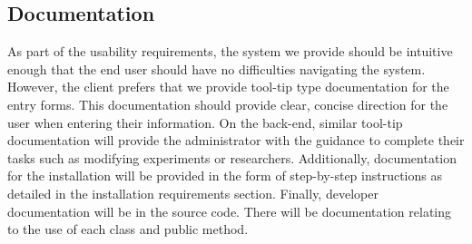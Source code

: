 \subsection{Documentation}
As part of the usability requirements, the system we provide should be intuitive enough that the end user should have no difficulties navigating the system. However, the client prefers that we provide tool-tip type documentation for the entry forms. This documentation should provide clear, concise direction for the user when entering their information. On the back-end, similar tool-tip documentation will provide the administrator with the guidance to complete their tasks such as modifying experiments or researchers. Additionally, documentation for the installation will be provided in the form of step-by-step instructions as detailed in the installation requirements section. Finally, developer documentation will be in the source code. There will be documentation relating to the use of each class and public method.